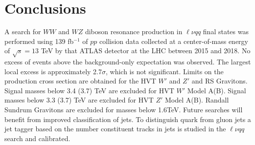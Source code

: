 \label{ch:conclusion}
\chapter{Conclusions}

A search for $WW$ and $WZ$ diboson resonance production in $\ell \nu qq $ final states was performed using 139 fb$^{-1}$ of $pp$ collision data collected at a center-of-mass energy of $\sqrt{s}=13$ TeV by that ATLAS detector at the LHC between 2015 and 2018. No excess of events above the background-only expectation was observed. The largest local excess is approximately 2.7$\sigma$, which is not significant. Limits on the production cross section are obtained for the HVT $W'$ and $Z'$ and RS Gravitons. Signal masses below 3.4 (3.7) TeV are excluded for HVT $W'$ Model A(B). Signal masses below 3.3 (3.7) TeV are excluded for HVT $Z'$ Model A(B). Randall Sundrum Gravitons are excluded for masses below 1.6TeV. Future searches will benefit from improved classification of jets. To distinguish quark from gluon jets a jet tagger based on the number constituent tracks in jets is studied in the $\ell \nu qq$ search and calibrated.
